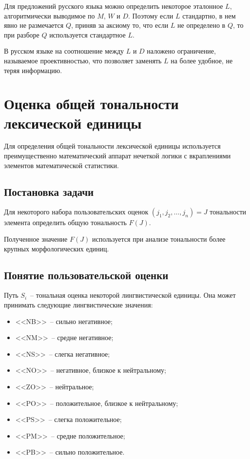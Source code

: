 \documentclass[a4paper,14pt,russian]{extreport}
\begin{document}
Для предложений русского языка можно определить некоторое эталонное $L$, алгоритмически выводимое по $M$, $W$ и $D$. Поэтому если $L$ стандартно, в нем явно не размечается $Q$, приняв за аксиому то, что если $L$ не определено в $Q$, то при разборе $Q$ используется стандартное $L$.

В русском языке на соотношение между $L$ и $D$ наложено ограничение, называемое проективностью, что позволяет заменять $L$ на более удобное, не теряя информацию.
\section{Оценка общей тональности лексической единицы}
Для определения общей тональности лексической единицы используется преимущественно математический аппарат нечеткой логики с вкраплениями элементов математической статистики.

\subsection{Постановка задачи}
Для некоторого набора пользовательских оценок $\left(j_1,j_2,\dots,j_n\right)=J$ тональности элемента определить общую тональность $F\left(J\right)$.

Полученное значение $F\left(J\right)$ используется при анализе тональности более крупных морфологических единиц.

\subsection{Понятие пользовательской оценки}

Путь $S_i$~-- тональная оценка некоторой лингвистической единицы. Она может принимать следующие лингвистические значения:

\begin{itemize}
\item <<NB>>~-- сильно негативное;
\item <<NM>>~-- средне негативное;
\item <<NS>>~-- слегка негативное;
\item <<NO>>~-- негативное, близкое к нейтральному;
\item <<ZO>>~-- нейтральное;
\item <<PO>>~-- положительное, близкое к нейтральному;
\item <<PS>>~-- слегка положительное;
\item <<PM>>~-- средне положительное;
\item <<PB>>~-- сильно положительное.
\end{itemize}
\end{document}
